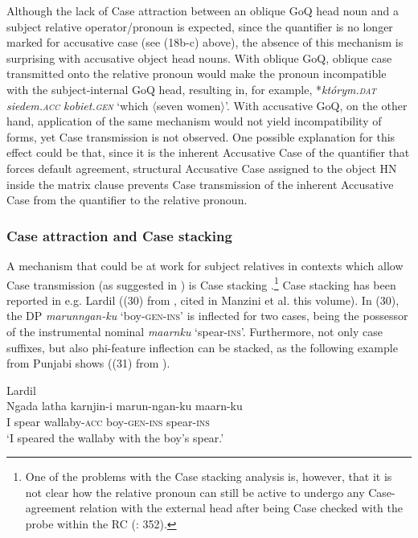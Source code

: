 \documentclass[output=paper]{langsci/langscibook}
\begin{document}
Although the lack of Case attraction between an oblique GoQ head noun and a subject relative operator\slash pronoun is expected, since the quantifier is no longer marked for accusative case (see (18b-c) above), the absence of this mechanism is surprising with accusative object head nouns. With oblique GoQ, oblique case transmitted onto the relative pronoun would make the pronoun incompatible with the subject-internal GoQ head, resulting in, for example, *\textit{którym.\textsc{dat}} \textit{siedem.\textsc{acc}} \textit{kobiet.\textsc{gen}} ‘which $\langle$seven women$\rangle$’. With accusative GoQ, on the other hand, application of the same mechanism would not yield incompatibility of forms, yet Case transmission is not observed. One possible explanation for this effect could be that, since it is the inherent Accusative Case of the quantifier that forces default agreement, structural Accusative Case assigned to the object HN inside the matrix clause prevents Case transmission of the inherent Accusative Case from the quantifier to the relative pronoun. 

\subsubsection{Case attraction and Case stacking}%

A mechanism that could be at work for subject relatives in contexts which allow Case transmission (as suggested in \citealt{Łęska2016}) is Case stacking \citep{Vogel2001}.\footnote{One of the problems with the Case stacking analysis is, however, that it is not clear how the relative pronoun can still be active to undergo any Case-agreement relation with the external head after being Case checked with the probe within the RC (\citealt{Georgi2014}: 352).} Case stacking has been reported in e.g. Lardil ((30) from \citealt{Richards2013}, cited in Manzini et al. this volume). In (30), the DP \textit{marunngan-ku} ‘boy-\textsc{gen-ins}’ is inflected for two cases, being the possessor of the instrumental nominal \textit{maarnku} ‘spear\textsc{{}-ins}’. Furthermore, not only case suffixes, but also phi-feature inflection can be stacked, as the following example from Punjabi shows ((31) from \citealt[316]{Manzini2015}). 

\ea%
         Lardil\label{ex:leska:30}\\
    \gll Ngada   latha   karnjin-i   marun-ngan-ku   maarn-ku   \\
         I     spear   wallaby-\textsc{acc} boy-\textsc{gen-ins}   spear-\textsc{ins}\\
    \glt ‘I speared the wallaby with the boy’s spear.’
    \z
\end{document}
